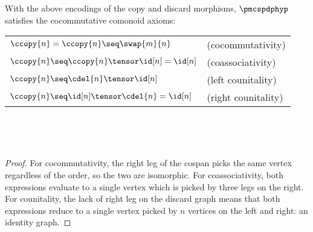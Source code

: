 \documentclass[10pt]{article}
\begin{document}
\begin{proposition}
    With the above encodings of the copy and discard morphisms, $\pmcspdphyp$ satisfies the cocommutative comonoid axioms:

    \begin{center}
        \toggletrue{stringtypes}
        \begin{tabular}{l l}
            $\ccopy{n} = \ccopy{n} \seq \swap{m}{n}$ & (cocommutativity) \\
            $\ccopy{n} \seq \ccopy{n} \tensor \id[n] = \id[n]$ & (coassociativity) \\
            $\ccopy{n} \seq \cdel{n} \tensor \id[n]$ & (left counitality) \\
            $\ccopy{n} \seq \id[n] \tensor \cdel{n} = \id[n]$ & (right counitality)
        \end{tabular}

        \vspace{1em}

        
        \
        \raisebox{-0.5em}{}
        \
        
        \
        
    \end{center}
\end{proposition}
\begin{proof}
    For cocommutativity, the right leg of the cospan picks the same vertex regardless of the order, so the two are isomorphic.
    For coassociativity, both expressions evaluate to a single vertex which is picked by three legs on the right.
    For counitality, the lack of right leg on the discard graph means that both expressions reduce to a single vertex picked by $n$ vertices on the left and right: an identity graph.
\end{proof}
\end{document}
